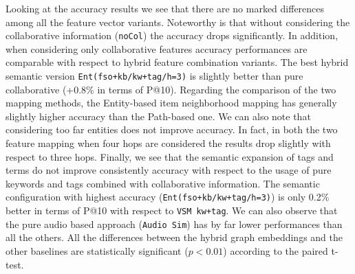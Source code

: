 Looking at the accuracy results we see that there are no marked differences among all the feature vector variants. Noteworthy is that without considering the collaborative information (\texttt{noCol}) the accuracy drops significantly. In addition, when considering only collaborative features accuracy performances are comparable with respect to hybrid feature combination variants. The best hybrid semantic version \texttt{Ent(fso+kb/kw+tag/h=3)} is slightly better than pure collaborative (+0.8\% in terms of P@10). 
Regarding the comparison of the two mapping methods, the Entity-based item neighborhood mapping has generally slightly higher accuracy than the Path-based one. We can also note that considering too far entities does not improve accuracy. In fact, in both the two feature mapping when four hops are considered the results drop slightly with respect to three hops. 
Finally, we see that the semantic expansion of tags and terms do not improve consistently accuracy with respect to the usage of pure keywords and tags combined with collaborative information. The semantic configuration with highest accuracy (\texttt{Ent(fso+kb/kw+tag/h=3)}) is only 0.2\% better in terms of P@10 with respect to  \texttt{VSM kw+tag}. We can also observe that the pure audio based approach (\texttt{Audio Sim}) has by far lower performances than all the others. All the differences between the hybrid graph embeddings and the other baselines are statistically significant ($p<0.01$) according to the paired t-test.


